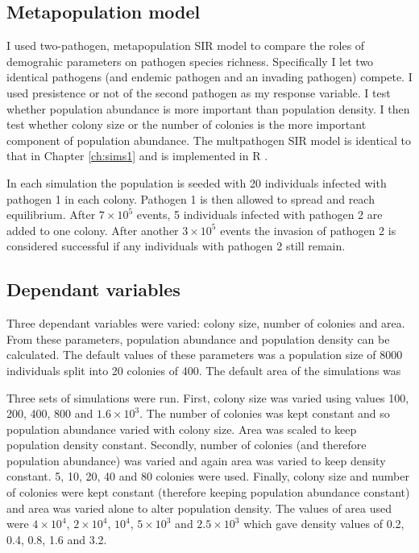 




\subsection{Metapopulation model}



I used two-pathogen, metapopulation SIR model to compare the roles of demograhic parameters on pathogen species richness.
Specifically I let two identical pathogens (and endemic pathogen and an invading pathogen) compete.
I used presistence or not of the second pathogen as my response variable.
I test whether population abundance is more important than population density.
I then test whether colony size or the number of colonies is the more important component of population abundance.
The multpathogen SIR model is identical to that in Chapter \ref{ch:sims1} and is implemented in R \cite{R}.



In each simulation the population is seeded with 20 individuals infected with pathogen 1 in each colony. 
Pathogen 1 is then allowed to spread and reach equilibrium. 
After \ensuremath{7\times 10^{5}} events, 5 individuals infected with pathogen 2 are added to one colony. 
After another \ensuremath{3\times 10^{5}} events the invasion of pathogen 2 is considered successful if any individuals with pathogen 2 still remain.

\subsection{Dependant variables}

Three dependant variables were varied: colony size, number of colonies and area.
From these parameters, population abundance and population density can be calculated.
The default values of these parameters was a population size of 8000 individuals split into 20 colonies of 400.
The default area of the simulations was 

Three sets of simulations were run.
First, colony size was varied using values 100, 200, 400, 800 and \ensuremath{1.6\times 10^{3}}.
The number of colonies was kept constant and so population abundance varied with colony size.
Area was scaled to keep population density constant. 
Secondly, number of colonies (and therefore population abundance) was varied and again area was varied to keep density constant.
5, 10, 20, 40 and 80 colonies were used.
Finally, colony size and number of colonies were kept constant (therefore keeping population abundance constant) and area was varied alone to alter population density. 
The values of area used were \ensuremath{4\times 10^{4}}, \ensuremath{2\times 10^{4}}, \ensuremath{10^{4}}, \ensuremath{5\times 10^{3}} and \ensuremath{2.5\times 10^{3}} which gave density values of 0.2, 0.4, 0.8, 1.6 and 3.2.

